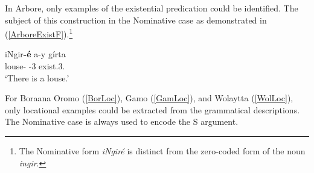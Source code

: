 



In Arbore, only examples of the existential predication could be identified. 
The subject of this construction in the Nominative case as demonstrated in (\ref{ArboreExistF}).\footnote{The Nominative form \emph{\textglotstop iNgir\'e} is distinct from the zero-coded form of the noun \emph{\textglotstop ingir}.}

\begin{exe} 
\ex\label{ArboreExistF}
\gll \textglotstop iNgir\textbf{-\'e} \textglotstop a-y g\'irta\\
louse-\nom{} \pvs{}-3\sg{} exist.3\sg{}.\fem{}\\
\glt `There is a louse.'
\end{exe}

For Boraana Oromo (\ref{BorLoc}), Gamo (\ref{GamLoc}), and Wolaytta (\ref{WolLoc}), only locational examples could be extracted from the grammatical descriptions.
The Nominative case is always used to encode the S argument.

